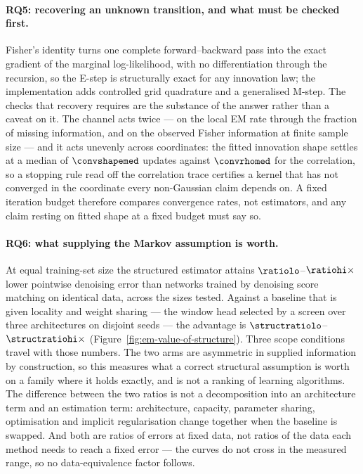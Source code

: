 \paragraph{RQ5: recovering an unknown transition, and what must be checked
first.} Fisher's identity turns one complete forward--backward pass into the
exact gradient of the marginal log-likelihood, with no differentiation through
the recursion, so the E-step is structurally exact for any innovation law; the
implementation adds controlled grid quadrature and a generalised M-step. The
checks that recovery requires are the substance of the answer rather than a
caveat on it. The channel acts twice --- on the local EM rate through the
fraction of missing information, and on the observed Fisher information at
finite sample size --- and it acts unevenly across coordinates: the fitted
innovation shape settles at a median of $\convshapemed$ updates against
$\convrhomed$ for the correlation, so a stopping rule read off the correlation
trace certifies a kernel that has not converged in the coordinate every
non-Gaussian claim depends on. A fixed iteration budget therefore compares
convergence rates, not estimators, and any claim resting on fitted shape at a
fixed budget must say so.

\paragraph{RQ6: what supplying the Markov assumption is worth.} At equal
training-set size the structured estimator attains $\ratiolo$--$\ratiohi\times$
lower pointwise denoising error than networks trained by denoising score
matching on identical data, across the \nsizesused{} sizes tested. Against a
baseline that is given locality and weight sharing --- the window head selected
by a screen over three architectures on disjoint seeds --- the advantage is
$\structratiolo$--$\structratiohi\times$ (Figure~\ref{fig:em-value-of-structure}).
Three scope conditions travel with those numbers. The two arms are asymmetric in
supplied information by construction, so this measures what a correct structural
assumption is worth on a family where it holds exactly, and is not a ranking of
learning algorithms. The difference between the two ratios is not a
decomposition into an architecture term and an estimation term: architecture,
capacity, parameter sharing, optimisation and implicit regularisation change
together when the baseline is swapped. And both are ratios of errors at fixed
data, not ratios of the data each method needs to reach a fixed error --- the
curves do not cross in the measured range, so no data-equivalence factor
follows.

